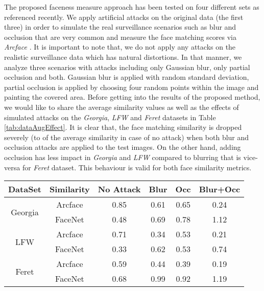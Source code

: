 \documentclass[runningheads]{llncs}
\begin{document}
The proposed faceness measure approach has been tested on four different sets as referenced recently. We apply artificial attacks on the original data (the first three) in order to simulate the real surveillance scenarios such as blur and occlusion that are very common and measure the face matching scores via \textit{Arcface} \cite{ArcFace2018}. It is important to note that, we do not apply any attacks on the realistic surveillance data which has natural distortions. In that manner, we analyze three scenarios with attacks including only Gaussian blur, only partial occlusion and both. Gaussian blur is applied with random standard deviation, partial occlusion is applied by choosing four random points within the image and painting the covered area. Before getting into the results of the proposed method, we would like to share the average similarity values as well as the effects of simulated attacks on the \textit{Georgia}, \textit{LFW} and \textit{Feret} datasets in Table \ref{tab:dataAugEffect}. It is clear that, the face matching similarity is dropped severely (to  of the average similarity in case of no attack) when both blur and occlusion attacks are applied to the test images. On the other hand, adding occlusion has less impact in \textit{Georgia} and \textit{LFW} compared to blurring that is vice-versa for \textit{Feret} dataset. This behaviour is valid for both face similarity metrics.

\begin{table*}[t]
\centering
\begin{center}
    \caption{The effect of attacks on different average face matching scores for different datasets}
        \begin{tabular}{c c c c c c}
            {DataSet} & Similarity & {No Attack} & {Blur} & {Occ} & Blur+Occ \\
            \hline
            \multirow{2}{*}{Georgia} & Arcface & 0.85 & 0.61 & 0.65 & 0.24 \\
            & FaceNet & 0.48 & 0.69 & 0.78 & 1.12 \\
            \hline
            \multirow{2}{*}{LFW} & Arcface & 0.71 & 0.34 & 0.53 & 0.21 \\
            & FaceNet & 0.33 & 0.62 & 0.53 & 0.74  \\
            \hline
            \multirow{2}{*}{Feret} & Arcface & 0.59 & 0.44 & 0.39 & 0.19 \\
            & FaceNet & 0.68 & 0.99 & 0.92 & 1.19 \\
            \hline
        \end{tabular}
        \label{tab:dataAugEffect}
\end{center}
\centering
\end{table*}
\end{document}
